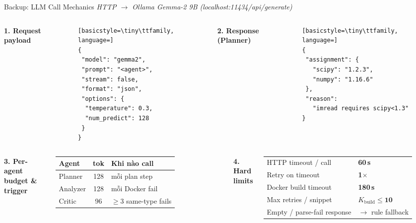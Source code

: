\documentclass[aspectratio=169,10pt]{beamer}
\begin{document}
\begin{frame}[fragile]{Backup: LLM Call Mechanics}
\vspace{0.1em}
{\tiny\color{gray}\textit{HTTP $\to$ Ollama Gemma-2 9B (localhost:11434/api/generate)}}

\vspace{0.5em}
\begin{columns}[T,onlytextwidth]
\scriptsize\textbf{\color{navydeep}1. Request payload}
\vspace{0.2em}
\begin{lstlisting}[basicstyle=\tiny\ttfamily, language=]
{
 "model": "gemma2",
 "prompt": "<agent>",
 "stream": false,
 "format": "json",
 "options": {
  "temperature": 0.3,
  "num_predict": 128
 }
}
\end{lstlisting}

\scriptsize\textbf{\color{navydeep}2. Response (Planner)}
\vspace{0.2em}
\begin{lstlisting}[basicstyle=\tiny\ttfamily, language=]
{
 "assignment": {
   "scipy": "1.2.3",
   "numpy": "1.16.6"
 },
 "reason":
   "imread requires scipy<1.3"
}
\end{lstlisting}
\end{columns}

\vspace{1.2em}

\begin{columns}[T,onlytextwidth]
\scriptsize\textbf{\color{navydeep}3. Per-agent budget \& trigger}\\[0.4em]
\scriptsize
\begin{tabular}{@{}l c l@{}}
\toprule
\textbf{Agent} & \textbf{tok} & \textbf{Khi nào call} \\
\midrule
Planner   & 128 & mỗi plan step \\
Analyzer  & 128 & mỗi Docker fail \\
Critic    & 96  & $\ge\!3$ same-type fails \\
\bottomrule
\end{tabular}

\scriptsize\textbf{\color{navydeep}4. Hard limits}\\[0.4em]
\scriptsize
\begin{tabular}{@{}l l@{}}
HTTP timeout / call         & \textbf{60\,s} \\
Retry on timeout            & \textbf{1$\times$} \\
Docker build timeout        & \textbf{180\,s} \\
Max retries / snippet       & $K_{\text{build}}\!\le\!\textbf{10}$ \\
Empty / parse-fail response & $\to$ rule fallback \\
\end{tabular}
\end{columns}
\end{frame}
\end{document}
